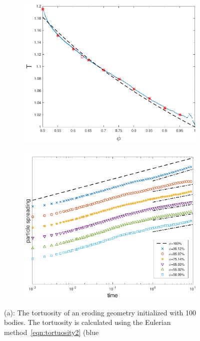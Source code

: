 \documentclass[preprint,10pt]{elsarticle}
\begin{document}
\begin{figure}[H]
\begin{subfigure}[b]{0.5\textwidth}
\includegraphics*[height = 0.8\linewidth]{./figs/tort_eulerian100}
\caption{}
\end{subfigure}
\begin{subfigure}[b]{0.5\textwidth}
\includegraphics*[height=0.8\linewidth]{./figs/100b_second_moment_long_ref}
\caption{}
\end{subfigure}
\caption{\label{fig:Eroding100Transport} (a): The tortuosity of an
eroding geometry initialized with 100 bodies.  The tortuosity is
calculated using the Eulerian method~\eqref{eqn:tortuosity2} (blue
}
\end{figure}
\end{document}
